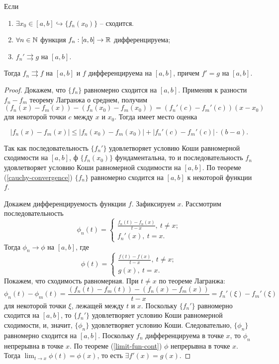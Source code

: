 \begin{theorem}
    \label{covergence-3.4}
    Если
    \begin{enumerate}
        \item $\exists x_{0} \in [a, b] \hookrightarrow \{f_{n}(x_{0})\}$ -- сходится.
        \item $\forall n \in \mathbb{N}$ функция $f_{n}: [a, b] \to \mathbb{R}$ дифференцируема;
        \item $f_{n}' \rightrightarrows g$ на $[a, b]$.
    \end{enumerate}
    Тогда $f_{n} \rightrightarrows f$ на $[a, b]$ и $f$ дифференцируема на $[a, b]$, причем $f' = g$ на $[a, b]$.
\end{theorem}

\begin{proof}
    Докажем, что $\{f_{n}\}$ равномерно сходится на $[a, b]$. Применяя к разности $f_{n} - f_{m}$ теорему Лагранжа о среднем, получим $(f_{n}(x) - f_{m}(x)) - (f_{n}(x_{0}) - f_{m}(x_{0})) = (f_{n}'(c) - f_{m}'(c))(x - x_{0})$ для некоторой точки $c$ между $x$ и $x_{0}$. Тогда имеет место оценка

    \[|f_{n}(x) - f_{m}(x)| \leq |f_{n}(x_{0}) - f_{m}(x_{0})| + |f_{n}'(c) - f_{m}'(c)|\cdot (b - a).\]

    Так как последовательность $\{f_{n}'\}$ удовлетворяет условию Коши равномерной сходимости на $[a, b]$, ф $\{f_{n}(x_{0})\}$ фундаментальна, то и последовательность $f_{n}$ удовлетворяет условию Коши равномерной сходимости на $[a, b]$. По теореме (\ref{cauchy-convergence}) $\{f_{n}\}$ равномерно сходится на $[a, b]$ к некоторой функции $f$.

    Докажем дифференцируемость функции $f$. Зафиксируем $x$. Рассмотрим последовательность
    \[
    \phi_{n}(t) = \begin{cases}
        \frac{f_{n}(t) - f_{n}(x)}{t - x}, \ t \neq x; \\
        f_{n}'(x), \ t = x.
    \end{cases}
    \]
    Тогда $\phi_{n} \to \phi$ на $[a, b]$, где 
    \[\phi(t) = \begin{cases}
        \frac{f(t) - f(x)}{t - x}, \ t \neq x; \\
        g(x), \ t = x.
    \end{cases}\]
    Покажем, что сходимость равномерная. При $t \neq x$ по теореме Лагранжа:
    \[\phi_{n}(t) - \phi_{m}(t) = \frac{(f_{n}(t) - f_{m}(t)) - (f_{n}(x) - f_{m}(x))}{t - x} = f_{n}'(\xi) - f_{m}'(\xi)\]
    для некоторой точки $\xi$, лежащей между $t$ и $x$. Поскольку $\{f_{n}'\}$ равномерно сходится на $[a, b]$, то $\{f_{n}'\}$ удовлетворяет условию Коши равномерной сходимости, и, значит, $\{\phi_n\}$ удовлетворяет условию Коши.
    Следовательно, $\{\phi_n\}$ равномерно сходится на $[a, b]$.
    Поскольку $f_n$ дифференцируема в точке $x$, то $\phi_n$ непрерывна в точке $x$. По теореме (\ref{limit-fun-cont}) $\phi$ непрерывна в точке $x$. Тогда $\lim_{t \rightarrow x} \phi(t) = \phi(x)$, то есть $\exists f'(x) = g(x)$.
\end{proof}